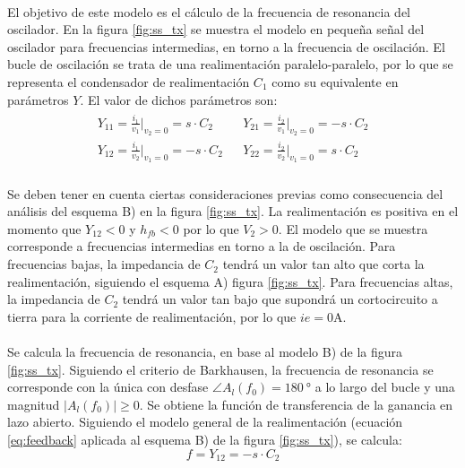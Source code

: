 \paragraph{}
El objetivo de este modelo es el cálculo de la frecuencia de resonancia del oscilador. En la figura \ref{fig:ss_tx} se muestra el modelo en pequeña señal del oscilador para frecuencias intermedias, en torno a la frecuencia de oscilaci\'on. El bucle de oscilaci\'on se trata de una realimentación paralelo-paralelo, por lo que se representa el condensador de realimentación $C_1$ como su equivalente en par\'ametros $Y$. El valor de dichos par\'ametros son:
\[
\begin{array}{rl} 
      \begin{array}{l}
	 Y_{11} = \frac{i_1}{v_1}|_{v_2 = 0} = s \cdot C_2 \\
	 Y_{12} = \frac{i_1}{v_2}|_{v_1 = 0} = -s \cdot C_2 
      \end{array}
      &
      \begin{array}{l}
	 Y_{21} = \frac{i_2}{v_1}|_{v_2 = 0} = -s \cdot C_2 \\
	 Y_{22} = \frac{i_2}{v_2}|_{v_1 = 0} = s \cdot C_2 
      \end{array}
\end{array}
\]
\paragraph{}
Se deben tener en cuenta ciertas consideraciones previas como consecuencia del an\'alisis del esquema B) en la figura \ref{fig:ss_tx}. La realimentaci\'on es positiva en el momento que $Y_{12}<0$ y $h_{fb}<0$ por lo que $V_2>0$. El modelo que se muestra corresponde a frecuencias intermedias en torno a la de oscilaci\'on. Para frecuencias bajas, la impedancia de $C_2$ tendrá un valor tan alto que corta la realimentación, siguiendo el esquema A) figura \ref{fig:ss_tx}. 
Para frecuencias altas, la impedancia de $C_2$ tendr\'a un valor tan bajo que supondr\'a un cortocircuito a tierra para la corriente de realimentaci\'on, por lo que $ie = 0 \unit{\ampere}$.
\paragraph{}
Se calcula la frecuencia de resonancia, en base al modelo B) de la figura \ref{fig:ss_tx}. Siguiendo el criterio de Barkhausen, la frecuencia de resonancia se corresponde con la única con desfase $\angle A_l(f_0) = \SI{180}{\degree}$ a lo largo del bucle y una magnitud $|A_l(f_0)|\ge 0$. Se obtiene la funci\'on de transferencia de la ganancia en lazo abierto.
Siguiendo el modelo general de la realimentaci\'on (ecuaci\'on \ref{eq:feedback} aplicada al esquema B) de la figura \ref{fig:ss_tx}), se calcula: 
\begin{equation}
f = Y_{12} = -s \cdot C_2
\end{equation}
